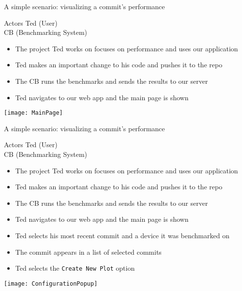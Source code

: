 \begin{frame}{A simple scenario: visualizing a commit's performance}
  \begin{block}{Actors}
    Ted (User)\\
    CB (Benchmarking System)
  \end{block}
  \begin{itemize}
    \item The project Ted works on focuses on performance and uses our application\pause
    \item Ted makes an important change to his code and pushes it to the repo\pause
    \item The CB runs the benchmarks and sends the results to our server\pause
    \item Ted navigates to our web app and the main page is shown
  \end{itemize}
\end{frame}

\begin{frame}
  \texttt{[image: MainPage]}
\end{frame}

\begin{frame}{A simple scenario: visualizing a commit's performance}
  \begin{block}{Actors}
    Ted (User)\\
    CB (Benchmarking System)
  \end{block}
  \begin{itemize}
    \item The project Ted works on focuses on performance and uses our application
    \item Ted makes an important change to his code and pushes it to the repo
    \item The CB runs the benchmarks and sends the results to our server
    \item Ted navigates to our web app and the main page is shown
    \item Ted selects his most recent commit and a device it was benchmarked on\pause
    \item The commit appears in a list of selected commits\pause
    \item Ted selects the \texttt{Create New Plot} option
  \end{itemize}
\end{frame}

\begin{frame}
  \texttt{[image: ConfigurationPopup]}
\end{frame}

